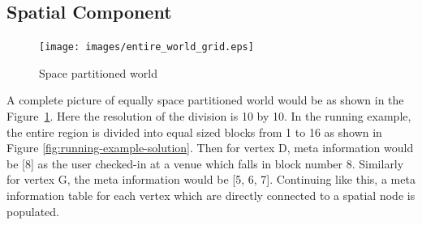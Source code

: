 


\subsection{Spatial Component}

\begin{figure}[t]
	\centering \texttt{[image: images/entire\_world\_grid.eps]}
    \caption{Space partitioned world}
    \label{fig:space-partitioned}
\end{figure}

A complete picture of equally space partitioned world would be as shown in the Figure~\ref{fig:space-partitioned}. Here the resolution of the division is 10 by 10. In the running example, the entire region is divided into equal sized blocks from 1 to 16 as shown in Figure \ref{fig:running-example-solution}. Then for vertex D, meta information would be [8] as the user checked-in at a venue which falls in block number 8. Similarly for vertex G, the meta information would be [5, 6, 7]. Continuing like this, a meta information table for each vertex which are directly connected to a spatial node is populated.

